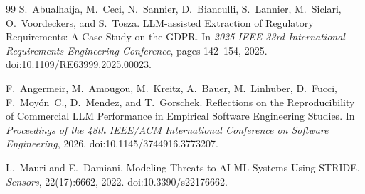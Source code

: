 \documentclass[12pt,a4paper,oneside]{report}
\begin{document}
\begin{thebibliography}{99}
S.~Abualhaija, M.~Ceci, N.~Sannier, D.~Bianculli, S.~Lannier, M.~Siclari, O.~Voordeckers, and S.~Tosza.
\newblock LLM-assisted Extraction of Regulatory Requirements: A Case Study on the GDPR.
\newblock In \emph{2025 IEEE 33rd International Requirements Engineering Conference}, pages 142--154, 2025.
\newblock doi:10.1109/RE63999.2025.00023.

F.~Angermeir, M.~Amougou, M.~Kreitz, A.~Bauer, M.~Linhuber, D.~Fucci, F.~Moy{\'o}n~C., D.~Mendez, and T.~Gorschek.
\newblock Reflections on the Reproducibility of Commercial LLM Performance in Empirical Software Engineering Studies.
\newblock In \emph{Proceedings of the 48th IEEE/ACM International Conference on Software Engineering}, 2026.
\newblock doi:10.1145/3744916.3773207.

L.~Mauri and E.~Damiani.
\newblock Modeling Threats to AI-ML Systems Using STRIDE.
\newblock \emph{Sensors}, 22(17):6662, 2022.
\newblock doi:10.3390/s22176662.

\end{thebibliography}
\end{document}

